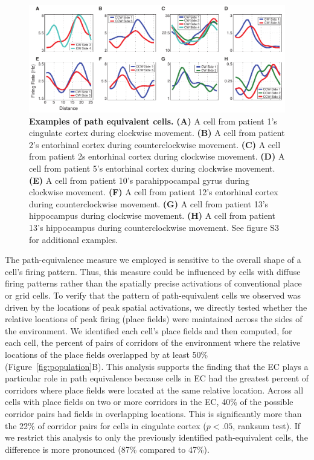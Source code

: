 \begin{figure}[t]
\centering 
\includegraphics[width=.99\textwidth]{./tex/linearGrids/figs/Figure3}
\caption[Examples of path equivalent cells]{\textbf{Examples of path equivalent cells.} \textbf{(A)} A cell from patient 1's cingulate cortex during clockwise movement. \textbf{(B)} A cell from patient 2's entorhinal cortex during counterclockwise movement. \textbf{(C)} A cell from patient 2s entorhinal cortex during clockwise movement. \textbf{(D)} A cell from patient 5's entorhinal cortex during clockwise movement. \textbf{(E)} A cell from patient 10's parahippocampal gyrus during clockwise movement. \textbf{(F)} A cell from patient 12's entorhinal cortex during counterclockwise movement. \textbf{(G)} A cell from patient 13's hippocampus during clockwise movement. \textbf{(H)} A cell from patient 13's hippocampus during counterclockwise movement. See figure S3 for additional examples.} \label{fig:otherExamples}
\end{figure}


The path-equivalence measure we employed is sensitive to the overall shape of a cell's firing pattern.  Thus, this measure could be influenced by cells with diffuse firing patterns \cite{QuirEtal92} rather than the spatially precise activations  of conventional place or grid cells.  To verify that the pattern of path-equivalent cells we observed was driven by the locations of peak spatial activations, we directly tested whether the relative locations of peak firing  (place fields) were maintained across the sides of the environment. We identified each cell's place fields and then computed, for each cell, the percent of pairs of corridors of the environment where the relative locations of the place fields overlapped by at least 50\% (Figure~\ref{fig:population}B).  This analysis supports  the finding that the EC plays a particular role in path equivalence because cells in EC had the greatest percent of corridors where place fields were located at the same relative location. Across all cells with place fields on two or more corridors in the EC, 40\% of the possible corridor pairs had fields in overlapping locations. This is significantly more than the  22\% of corridor pairs for cells in cingulate cortex ($p<.05$, ranksum test). If we restrict this analysis to only the previously identified path-equivalent cells, the difference is more pronounced (87\% compared to 47\%).

